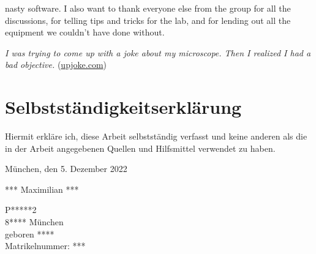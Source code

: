 \begin{minipage}{\textwidth}
nasty software. I also want to thank everyone else from the group for all the discussions, for telling tips and tricks for the lab, and for lending out all the equipment we couldn't have done without.

\begin{center}
    \small
    \textit{I was trying to come up with a joke about my microscope. Then I realized I had a bad objective.} (\href{https://upjoke.com/microscope-jokes}{upjoke.com})
\end{center}
\end{minipage}




\chapter*{Selbstständigkeitserklärung}
Hiermit erkläre ich, diese Arbeit selbstständig verfasst und keine anderen als die in der Arbeit angegebenen Quellen und Hilfsmittel verwendet zu haben.

\vspace{5cm}
München, den 5. Dezember 2022

\vspace{3cm}
*** Maximilian ***

\ifprintversion
P*****2 \\
8**** München \\
geboren **** \\
Matrikelnummer: ***
\fi

